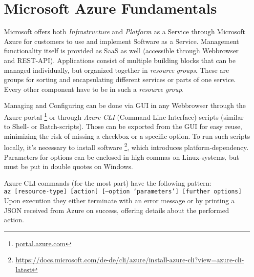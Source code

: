 \section{Microsoft Azure Fundamentals}\label{sec:ch2}Microsoft offers both \textit{Infrastructure} and \textit{Platform} as a Service through Microsoft Azure for customers to use and implement Software as a Service. Management functionality itself is provided as SaaS as well (accessible through Webbrowser and REST-API). Applications consist of multiple \glqq building blocks\grqq{} that can be managed individually, but organized together in \textit{resource groups}. These are groups for sorting and encapsulating different services or parts of one service. Every other component have to be in such a \textit{resource group}. 

Managing and Configuring can be done via GUI in any Webbrowser through the Azure portal \footnote{\url{portal.azure.com}} or through \textit{Azure CLI} (Command Line Interface) scripts (similar to Shell- or Batch-scripts). Those can be exported from the GUI for easy reuse, minimizing the risk of missing a checkbox or a specific option. To run such scripts locally, it's necessary to install software \footnote{\url{https://docs.microsoft.com/de-de/cli/azure/install-azure-cli?view=azure-cli-latest}}, which introduces platform-dependency. Parameters for options can be enclosed in high commas on Linux-systems, but must be put in double quotes on Windows.

Azure CLI commands (for the most part) have the following pattern:\\
\texttt{az [resource-type] [action] [--option 'parameters'] [further options]}\\
Upon execution they either terminate with an error message or by printing a JSON received from Azure on success, offering details about the performed action.

